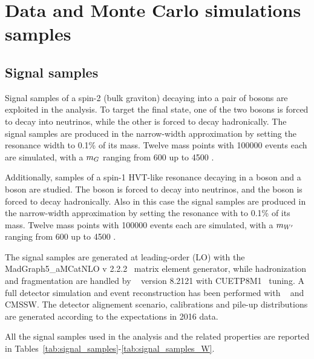 \section{Data and Monte Carlo simulations samples}
\label{sec:samples}

\subsection{Signal samples}

Signal samples of a spin-2 (bulk graviton) decaying into a pair of \Z bosons are exploited in the analysis. To target the final state, one of the two \Z bosons is forced to decay into neutrinos, while the other \Z is forced to decay hadronically. The signal samples are produced in the narrow-width approximation by setting the resonance width to 0.1\% of its mass. Twelve mass points with 100000 events each are simulated, with a $m_{G}$ ranging from 600 \GeV up to 4500 \GeV.

\noindent Additionally, samples of a spin-1 HVT-like \Wp resonance decaying in a \Z boson and a \W boson are studied. The \Z boson is forced to decay into neutrinos, and the \W boson is forced to decay hadronically. Also in this case the signal samples are produced in the narrow-width approximation by setting the resonance with to 0.1\% of its mass. Twelve mass points with 100000 events each are simulated, with a $m_{W'}$ ranging from 600 \GeV up to 4500 \GeV.

\noindent The signal samples are generated at leading-order (LO) with the {\sc MadGraph5\_aMCatNLO v 2.2.2}~\cite{bib:MADGRAPH} matrix element generator, while hadronization and fragmentation are handled by ~\cite{bib:PYTHIA} version 8.2121 with CUETP8M1~\cite{bib:CUETP8M1} tuning. A full detector simulation and event reconstruction has been performed with \GEANTfour~\cite{bib:GEANT4} and CMSSW. The detector alignement scenario, calibrations and pile-up distributions are generated according to the expectations in 2016 data.

\noindent All the signal samples used in the analysis and the related properties are reported in Tables~\ref{tab:signal_samples}-\ref{tab:signal_samples_W}.
 
